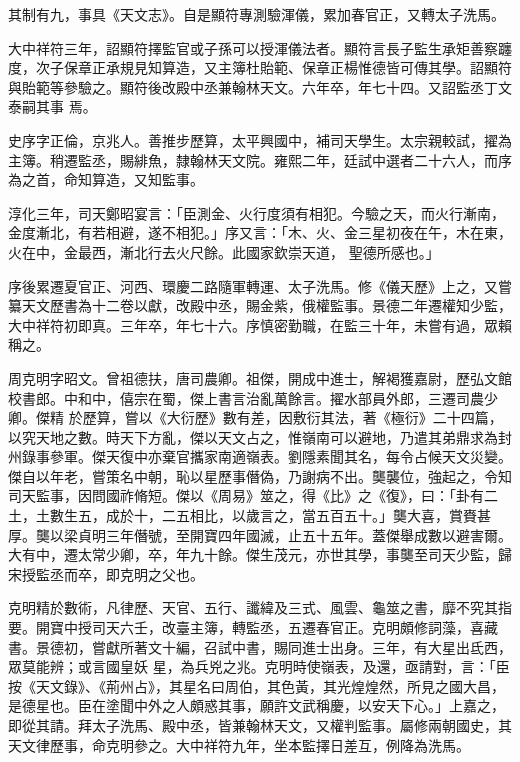 \begin{pinyinscope}
 其制有九，事具《天文志》。自是顯符專測驗渾儀，累加春官正，又轉太子洗馬。



 大中祥符三年，詔顯符擇監官或子孫可以授渾儀法者。顯符言長子監生承矩善察躔度，次子保章正承規見知算造，又主簿杜貽範、保章正楊惟德皆可傳其學。詔顯符與貽範等參驗之。顯符後改殿中丞兼翰林天文。六年卒，年七十四。又詔監丞丁文泰嗣其事
 焉。



 史序字正倫，京兆人。善推步歷算，太平興國中，補司天學生。太宗親較試，擢為主簿。稍遷監丞，賜緋魚，隸翰林天文院。雍熙二年，廷試中選者二十六人，而序為之首，命知算造，又知監事。



 淳化三年，司天鄭昭宴言：「臣測金、火行度須有相犯。今驗之天，而火行漸南，金度漸北，有若相避，遂不相犯。」序又言：「木、火、金三星初夜在午，木在東，火在中，金最西，漸北行去火尺餘。此國家欽崇天道，
 聖德所感也。」



 序後累遷夏官正、河西、環慶二路隨軍轉運、太子洗馬。修《儀天歷》上之，又嘗纂天文歷書為十二卷以獻，改殿中丞，賜金紫，俄權監事。景德二年遷權知少監，大中祥符初即真。三年卒，年七十六。序慎密勤職，在監三十年，未嘗有過，眾賴稱之。



 周克明字昭文。曾祖德扶，唐司農卿。祖傑，開成中進士，解褐獲嘉尉，歷弘文館校書郎。中和中，僖宗在蜀，傑上書言治亂萬餘言。擢水部員外郎，三遷司農少卿。傑精
 於歷算，嘗以《大衍歷》數有差，因敷衍其法，著《極衍》二十四篇，以究天地之數。時天下方亂，傑以天文占之，惟嶺南可以避地，乃遣其弟鼎求為封州錄事參軍。傑天復中亦棄官攜家南適嶺表。劉隱素聞其名，每令占候天文災變。傑自以年老，嘗策名中朝，恥以星歷事僭偽，乃謝病不出。龑襲位，強起之，令知司天監事，因問國祚脩短。傑以《周易》筮之，得《比》之《復》，曰：「卦有二土，土數生五，成於十，二五相比，以歲言之，當五百五十。」龑大喜，賞賚甚
 厚。龑以梁貞明三年僭號，至開寶四年國滅，止五十五年。蓋傑舉成數以避害爾。大有中，遷太常少卿，卒，年九十餘。傑生茂元，亦世其學，事龑至司天少監，歸宋授監丞而卒，即克明之父也。



 克明精於數術，凡律歷、天官、五行、讖緯及三式、風雲、龜筮之書，靡不究其指要。開寶中授司天六壬，改臺主簿，轉監丞，五遷春官正。克明頗修詞藻，喜藏書。景德初，嘗獻所著文十編，召試中書，賜同進士出身。三年，有大星出氐西，眾莫能辨；或言國皇妖
 星，為兵兇之兆。克明時使嶺表，及還，亟請對，言：「臣按《天文錄》、《荊州占》，其星名曰周伯，其色黃，其光煌煌然，所見之國大昌，是德星也。臣在塗聞中外之人頗惑其事，願許文武稱慶，以安天下心。」上嘉之，即從其請。拜太子洗馬、殿中丞，皆兼翰林天文，又權判監事。屬修兩朝國史，其天文律歷事，命克明參之。大中祥符九年，坐本監擇日差互，例降為洗馬。




\end{pinyinscope}
